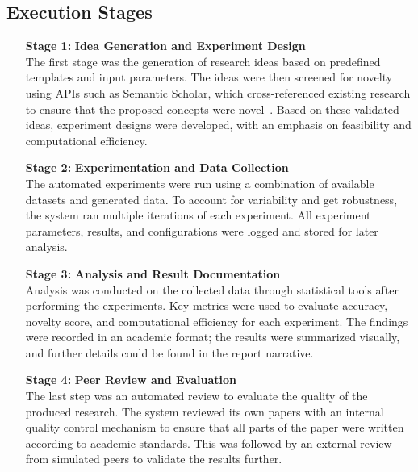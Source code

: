 \subsection{Execution Stages}
\begin{enumerate}[leftmargin=2cm, labelwidth=1.5cm]
    \item[\textbf{Stage 1:}] \textbf{Idea Generation and Experiment Design} \\
    The first stage was the generation of research ideas based on predefined templates and input parameters. The ideas were then screened for novelty using APIs such as Semantic Scholar, which cross-referenced existing research to ensure that the proposed concepts were novel~\cite{Shea2024PlaneSearch}. Based on these validated ideas, experiment designs were developed, with an emphasis on feasibility and computational efficiency.

    \item[\textbf{Stage 2:}] \textbf{Experimentation and Data Collection} \\
    The automated experiments were run using a combination of available datasets and generated data. To account for variability and get robustness, the system ran multiple iterations of each experiment. All experiment parameters, results, and configurations were logged and stored for later analysis.

    \item[\textbf{Stage 3:}] \textbf{Analysis and Result Documentation} \\
    Analysis was conducted on the collected data through statistical tools after performing the experiments. Key metrics were used to evaluate accuracy, novelty score, and computational efficiency for each experiment. The findings were recorded in an academic format; the results were summarized visually, and further details could be found in the report narrative.

    \item[\textbf{Stage 4:}] \textbf{Peer Review and Evaluation} \\
    The last step was an automated review to evaluate the quality of the produced research. The system reviewed its own papers with an internal quality control mechanism to ensure that all parts of the paper were written according to academic standards. This was followed by an external review from simulated peers to validate the results further.
\end{enumerate}

